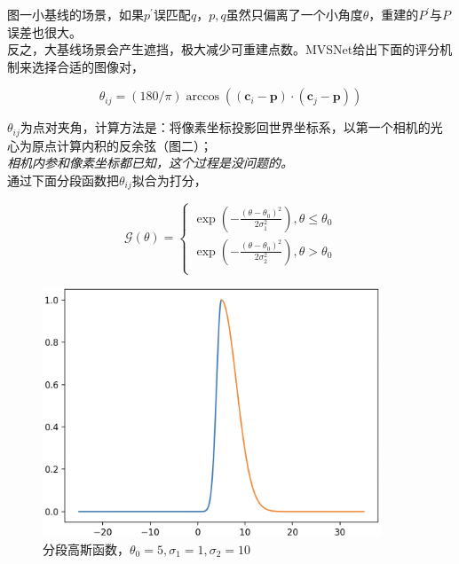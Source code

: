 	图一小基线的场景，如果$p^\prime$误匹配$q$，$p,q$虽然只偏离了一个小角度$\theta$，重建的$P^\prime$与$P$误差也很大。\\

	反之，大基线场景会产生遮挡，极大减少可重建点数。MVSNet给出下面的评分机制来选择合适的图像对，

	$$
		\theta_{ij} = (180/\pi)\arccos\left(
			(\mathbf{c}_i - \mathbf{p})
			\cdot
			(\mathbf{c}_j - \mathbf{p})
		\right)
	$$

	$\theta_{ij}$为点对夹角，计算方法是：将像素坐标投影回世界坐标系，以第一个相机的光心为原点计算内积的反余弦（图二）；\\

	\textit{相机内参和像素坐标都已知，这个过程是没问题的。}\\

	通过下面分段函数把$\theta_{ij}$拟合为打分，

	$$
		\mathcal{G}(\theta) = 
		\begin{cases}
			\exp\left(
				-\frac{(\theta-\theta_0)^2}{2\sigma_1^2}
			\right), \theta \leq \theta_0\\
			\exp\left(
				-\frac{(\theta-\theta_0)^2}{2\sigma_2^2}
			\right), \theta > \theta_0\\
		\end{cases}
	$$

	\begin{figure}[H]
		\begin{center}
			\includegraphics[width=0.9\textwidth]{images/piece_gaussian.png}
		\end{center}
		\caption{分段高斯函数，$\theta_0=5, \sigma_1 = 1, \sigma_2 = 10$}
	\end{figure}

